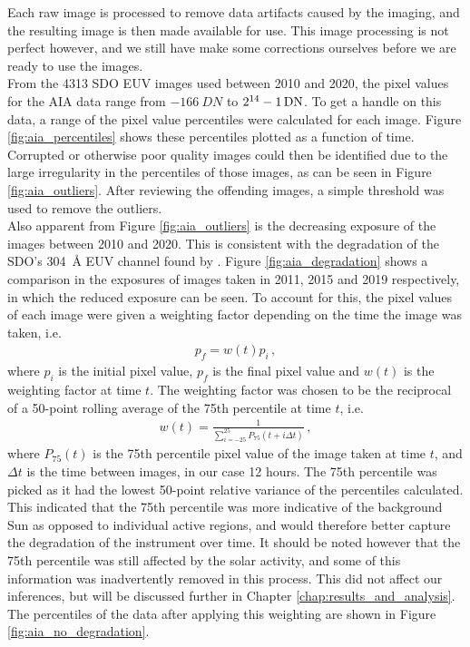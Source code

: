 \documentclass[11pt,a4paper,onecolumn]{report}
\begin{document}
Each raw image is processed to remove data artifacts caused by the imaging,
and the resulting image is then made available for use. This image processing is
not perfect however, and we still have make some corrections ourselves before we
are ready to use the images.\\

From the 4313 SDO EUV images used between 2010 and 2020, the pixel values for
the AIA data range from \(\SI[]{-166}[]{DN}\) to \(\SI[parse-numbers=false]{2^{14} - 1}[]{DN}\). To get
a handle on this data, a range of the pixel value percentiles were calculated
for each image. Figure \ref{fig:aia_percentiles} shows these percentiles plotted
as a function of time. Corrupted or otherwise poor quality images could then be
identified due to the large irregularity in the percentiles of those images, as
can be seen in Figure \ref{fig:aia_outliers}. After reviewing the offending
images, a simple threshold was used to remove the outliers.\\

Also apparent from Figure \ref{fig:aia_outliers} is the decreasing exposure of
the images between 2010 and 2020. This is consistent with the degradation of the
SDO's \SI{304}{\angstrom} EUV channel found by \citet{boerner_photometric_2014}.
Figure \ref{fig:aia_degradation} shows a comparison in the exposures of images
taken in 2011, 2015 and 2019 respectively, in which the reduced exposure can be
seen. To account for this, the pixel values of each image were given a weighting
factor depending on the time the image was taken, i.e.
\begin{align}
  p_f = w(t) p_i \, ,
\end{align}
where $p_i$ is the initial pixel value, $p_f$ is the final pixel value and $w(t)$
is the weighting factor at time $t$. The weighting factor was chosen to be the 
reciprocal of a 50-point rolling average of the 75th
percentile at time $t$, i.e.
\begin{align}
  w(t) = \frac{1}{\sum\limits_{i=-25}^{25}P_{75}(t + i \Delta t)} \, ,
\end{align}
where $P_{75}(t)$ is the 75th percentile pixel value of the image taken at time
$t$, and $\Delta t$ is the time between images, in our case 12 hours. The 75th
percentile was picked as it had the lowest 50-point relative variance of the
percentiles calculated. This indicated that the 75th percentile was more
indicative of the background Sun as opposed to individual active regions, and
would therefore better capture the degradation of the instrument over time. It
should be noted however that the 75th percentile was still affected by the solar
activity, and some of this information was inadvertently removed in this
process. This did not affect our inferences, but will be discussed further in
Chapter \ref{chap:results_and_analysis}. The percentiles of the data after
applying this weighting are shown in Figure \ref{fig:aia_no_degradation}. \\
\end{document}
